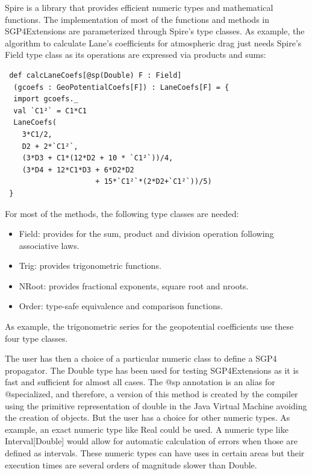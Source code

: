 \documentclass{article}
\begin{document}
Spire is a library that provides efficient numeric types and mathematical functions. The implementation of most of the functions and methods in SGP4Extensions are parameterized through Spire's type classes.
As example, the algorithm to calculate Lane's coefficients for atmospheric drag just needs Spire's Field type class
as its operations are expressed via products and sums:
\begin{verbatim}
 def calcLaneCoefs[@sp(Double) F : Field]
  (gcoefs : GeoPotentialCoefs[F]) : LaneCoefs[F] = {
  import gcoefs._
  val `C1²` = C1*C1
  LaneCoefs(
    3*C1/2,
    D2 + 2*`C1²`,
    (3*D3 + C1*(12*D2 + 10 * `C1²`))/4,
    (3*D4 + 12*C1*D3 + 6*D2*D2
                     + 15*`C1²`*(2*D2+`C1²`))/5)
 }
\end{verbatim}
For most of the methods, the following type classes are needed:
\begin{itemize}
  \item  Field: provides for the sum, product and division operation following associative laws.
  \item  Trig: provides trigonometric functions.
  \item  NRoot: provides fractional exponents, square root and nroots.
  \item  Order: type-safe equivalence and comparison functions.
\end{itemize}
As example, the trigonometric series for the geopotential coefficients use these four type classes.


The user has then a choice of a particular numeric class to define a SGP4 propagator.
The Double type has been used for testing SGP4Extensions
as it is fast and sufficient for almost all cases. The @sp annotation is an alias for
@specialized, and therefore, a version of this method is created by the compiler using the primitive representation of double in the Java Virtual Machine avoiding the creation of objects. But the user has a choice for other numeric types. As example, an exact numeric type like Real could be used. A numeric type like Interval[Double] would allow for automatic calculation of errors
when those are defined as intervals. These numeric types can have uses in certain areas
but their execution times are several orders of magnitude slower than Double.
\end{document}
